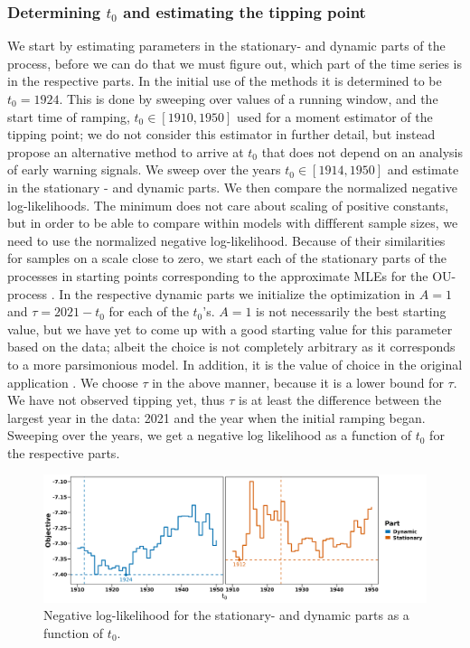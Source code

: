 \subsubsection{Determining $t_0$ and estimating the tipping point}
We start by estimating parameters in the stationary- and dynamic parts of the process, before we can do that we must figure out, which part of the time series is in the respective parts. In the initial use of the methods it is determined to be $t_0 = 1924$. This is done by sweeping over values of a running window, and the start time of ramping, $t_0 \in [1910, 1950]$ used for a moment estimator of the tipping point; we do not consider this estimator in further detail, but instead propose an alternative method to arrive at $t_0$ that does not depend on an analysis of early warning signals. We sweep over the years $t_0 \in [1914, 1950]$ and estimate in the stationary - and dynamic parts. We then compare the normalized negative log-likelihoods. The minimum does not care about scaling of positive constants, but in order to be able to compare within models with diffferent sample sizes, we need to use the normalized negative log-likelihood. Because of their similarities for samples on a scale close to zero, we start each of the stationary parts of the processes in starting points corresponding to the approximate MLEs for the OU-process \cite[equation (S4-S6)]{DitlevsenSupplementary}. In the respective dynamic parts we initialize the optimization in $A = 1$ and $\tau = 2021 - t_0$ for each of the $t_0$'s. $A = 1$ is not necessarily the best starting value, but we have yet to come up with a good starting value for this parameter based on the data; albeit the choice is not completely arbitrary as it corresponds to a more parsimonious model. In addition, it is the value of choice in the original application \cite{Ditlevsen2023}. We choose $\tau$ in the above manner, because it is a lower bound for $\tau$. We have not observed tipping yet, thus $\tau$ is at least the difference between the largest year in the data: 2021 and the year when the initial ramping began. Sweeping over the years, we get a negative log likelihood as a function of $t_0$ for the respective parts.
\begin{figure}[h!]
    \begin{center}
    \includegraphics[scale = .095]{figures/ramping_year_likelihood_plot.jpeg}
    \caption{Negative log-likelihood for the stationary- and dynamic parts as a function of $t_0$.}
    \label{figure:negLoglikRamping}        
    \end{center}
\end{figure}\\
